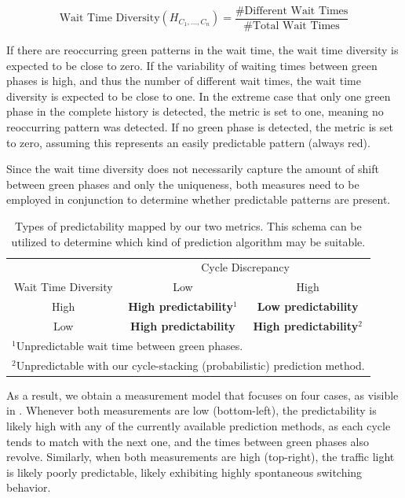 \begin{equation}
\text{Wait Time Diversity}(H_{C_1, \dots, C_n}) = \frac{\text{\# Different Wait Times}}{\text{\# Total Wait Times}}
\end{equation}

If there are reoccurring green patterns in the wait time, the wait time diversity is expected to be close to zero. If the variability of waiting times between green phases is high, and thus the number of different wait times, the wait time diversity is expected to be close to one. In the extreme case that only one green phase in the complete history is detected, the metric is set to one, meaning no reoccurring pattern was detected. If no green phase is detected, the metric is set to zero, assuming this represents an easily predictable pattern (always red).

Since the wait time diversity does not necessarily capture the amount of shift between green phases and only the uniqueness, both measures need to be employed in conjunction to determine whether predictable patterns are present.

\begin{table}[!b]
\centering
\def\arraystretch{1.5}
\caption{Types of predictability mapped by our two metrics. This schema can be utilized to determine which kind of prediction algorithm may be suitable.}
\label{tab:cases}
\begin{tabular}{c|c|c|}
\multicolumn{1}{c}{} & \multicolumn{2}{c}{Cycle Discrepancy} \\
\cline{2-3}
Wait Time Diversity& Low& High\\
\hline
\multicolumn{1}{|c|}{High}& \textbf{\color{good} High predictability}$^1$& \textbf{\color{bad} Low predictability} \\
\hline
\multicolumn{1}{|c|}{Low}& \textbf{\color{good} High predictability}& \textbf{\color{good} High predictability}$^2$\\
\hline
\multicolumn{3}{l}{$^1$\footnotesize{Unpredictable wait time between green phases.}} \\
\multicolumn{3}{l}{$^2$\footnotesize{Unpredictable with our cycle-stacking (probabilistic) prediction method.}}
\end{tabular}
\end{table}

As a result, we obtain a measurement model that focuses on four cases, as visible in . Whenever both measurements are low (bottom-left), the predictability is likely high with any of the currently available prediction methods, as each cycle tends to match with the next one, and the times between green phases also revolve. Similarly, when both measurements are high (top-right), the traffic light is likely poorly predictable, likely exhibiting highly spontaneous switching behavior. 

